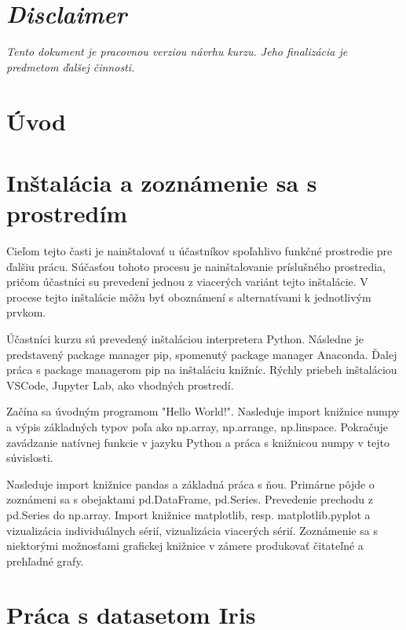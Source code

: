 \documentclass[12pt]{article}
\begin{document}
\section*{\textit{Disclaimer}}
\textit{Tento dokument je pracovnou verziou návrhu kurzu. Jeho finalizácia
        je predmetom ďalšej činnosti.
}

\newpage
\tableofcontents

\newpage
\section*{Úvod}
\label{sec:intro}

\section{Inštalácia a zoznámenie sa s prostredím}
Cieľom tejto časti je nainštalovať u účastníkov spoľahlivo funkčné
prostredie pre ďalšiu prácu. Súčasťou tohoto procesu je nainštalovanie
príslušného prostredia, pričom účastníci su prevedení jednou z viacerých
variánt tejto inštalácie. V procese tejto inštalácie môžu byť oboznámení
s alternatívami k jednotlivým prvkom.

Účastníci kurzu sú prevedený inštaláciou interpretera
Python. Následne je predstavený package manager pip, spomenutý package
manager Anaconda. Ďalej práca s package managerom pip na inštaláciu
knižníc. Rýchly priebeh inštaláciou VSCode, Jupyter Lab, ako vhodných
prostredí.

Začína sa úvodným programom "Hello World!". Nasleduje import
knižnice numpy a výpis základných typov poľa ako np.array, np.arrange,
np.linspace. Pokračuje zavádzanie natívnej funkcie v jazyku Python
a práca s knižnicou numpy v tejto súvislosti.

Nasleduje import knižnice pandas a základná práca s ňou. Primárne
pôjde o zoznámeni sa s obejaktami pd.DataFrame, pd.Series. Prevedenie
prechodu z pd.Series do np.array.
\newline \newline
Import knižnice matplotlib, resp. matplotlib.pyplot a vizualizácia
individuálnych sérií, vizualizácia viacerých sérií. Zoznámenie sa
s niektorými možnosťami grafickej knižnice v zámere produkovať
čitateľné a prehľadné grafy.

\section{Práca s datasetom Iris}
\end{document}
